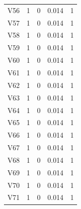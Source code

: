 \documentclass[a4paper, 12pt, openright, oneside, german, french, english, brazil]{abntex2}
\begin{document}
\begin{SingleSpace}
\begin{footnotesize}
\begin{center}
\begin{longtable}{c c c c c}
					V56 & 1 & 0 & 0.014 & 1 \\ 
					V57 & 1 & 0 & 0.014 & 1 \\ 
					V58 & 1 & 0 & 0.014 & 1 \\ 
					V59 & 1 & 0 & 0.014 & 1 \\ 
					V60 & 1 & 0 & 0.014 & 1 \\ 
					V61 & 1 & 0 & 0.014 & 1 \\ 
					V62 & 1 & 0 & 0.014 & 1 \\ 
					V63 & 1 & 0 & 0.014 & 1 \\ 
					V64 & 1 & 0 & 0.014 & 1 \\ 
					V65 & 1 & 0 & 0.014 & 1 \\ 
					V66 & 1 & 0 & 0.014 & 1 \\ 
					V67 & 1 & 0 & 0.014 & 1 \\ 
					V68 & 1 & 0 & 0.014 & 1 \\ 
					V69 & 1 & 0 & 0.014 & 1 \\ 
					V70 & 1 & 0 & 0.014 & 1 \\ 
					V71 & 1 & 0 & 0.014 & 1 \\ 
					
				\end{longtable}
			\end{center}
		\end{footnotesize}
	\end{SingleSpace}
	
\end{document}
